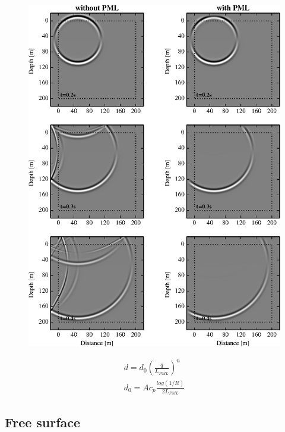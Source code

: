 \documentclass{gnulike}
\begin{document}
\begin{figure}[!ht]
  \centering
  \includegraphics[scale=1.0]{fig/validation_pml.eps}
\end{figure}

\begin{eqnarray}
\label{pml-damp}
d = d_{0} \left( \frac{q}{L_{PML}} \right) ^{n} \\
d_{0} = Ac_{p} \frac{log(1/R)}{2L_{PML}}
\end{eqnarray}

\subsection{Free surface}
\end{document}

